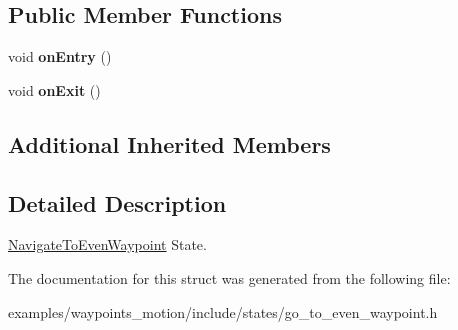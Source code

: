 \subsection*{Public Member Functions}
\begin{DoxyCompactItemize}
\item 
\mbox{\label{structNavigateToEvenWaypoint_1_1NavigateToEvenWaypoint_a2b03368922b1ec0f2e27843ef8f4e46f}} 
void {\bfseries on\+Entry} ()
\item 
\mbox{\label{structNavigateToEvenWaypoint_1_1NavigateToEvenWaypoint_ac479165ac75b4edcd92125ff2b7c0bb3}} 
void {\bfseries on\+Exit} ()
\end{DoxyCompactItemize}
\subsection*{Additional Inherited Members}


\subsection{Detailed Description}
\hyperlink{structNavigateToEvenWaypoint_1_1NavigateToEvenWaypoint}{Navigate\+To\+Even\+Waypoint} State. 

The documentation for this struct was generated from the following file\+:\begin{DoxyCompactItemize}
\item 
examples/waypoints\+\_\+motion/include/states/go\+\_\+to\+\_\+even\+\_\+waypoint.\+h\end{DoxyCompactItemize}
